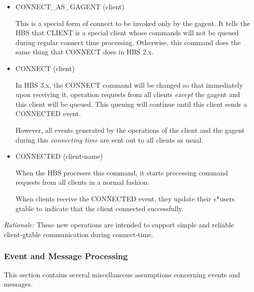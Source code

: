 \begin{itemize}

\item CONNECT\_AS\_GAGENT (client)
  
  This is a special form of connect to be invoked only by the gagent.  It
  tells the HBS that CLIENT is a special client whose commands will not be
  queued during regular connect time processing. Otherwise, this command does
  the same thing that CONNECT does in HBS 2.x.

\item CONNECT (client)
  
  In HBS 3.x, the CONNECT command will be changed so that immediately
  upon receiving it, operation requests from all clients {\em except} the
  gagent and this client will be queued.  This queuing will continue until
  this client sends a CONNECTED event.
  
  However, all events generated by the operations of the client and the
  gagent during this {\em connecting time} are sent out to all clients as
  usual.

\item CONNECTED (client-name)
  
  When the HBS processes this command, it starts processing command
  requests from all clients in a normal fashion.

  When clients receive the CONNECTED event, they update their s*users
  gtable to indicate that the client connected successfully.

\end{itemize}

{\em Rationale:} These new operations are intended to support simple and
reliable client-gtable communication during connect-time.

\subsubsection*{Event and Message Processing}

This section contains several miscellaneous assumptions concerning events
and messages.


